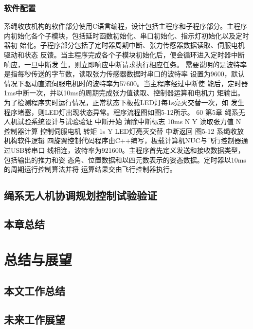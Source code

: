 \documentclass[lang=chs, degree=master, blindreview=false, winfonts=true]{yanputhesis}
\begin{document}
\subsection{软件配置}
系绳收放机构的软件部分使用C语言编程，设计包括主程序和子程序部分。主程序
内初始化各个子模块，包括延时函数初始化、串口初始化、指示灯初始化以及定时器初
始化。子程序部分包括了定时器周期中断、张力传感器数据读取、伺服电机驱动和状态
反馈。当主程序完成各个子模块初始化后，便会循环进入定时器中断响应，一旦中断发
生，则立即响应中断请求执行相应任务。 
需要说明的是波特率是指每秒传送的字节数，读取张力传感器数据时串口的波特率
设置为9600，默认情况下驱动直流伺服电机时的波特率为57600。当主程序经过中断使
能后，定时器1ms中断一次，并以10ms的周期完成张力值读取、控制器运算和电机力
矩输出。为了检测程序实时运行情况，正常状态下板载LED灯每1s亮灭交替一次，如
发生程序堵塞，则LED灯出现状态异常。程序流程图如图5-12所示。 
60 
第5章  绳系无人机试验系统设计与试验验证 
中断开始
清除中断标志
10ms
N
Y
读取张力值
N
控制器计算
控制伺服电机
转矩
1s
Y
LED灯亮灭交替
中断返回
图5-12 系绳收放机构软件逻辑 
四旋翼控制代码程序由C++编写，板载计算机NUC与飞行控制器通过USB转串口
线相连，波特率为921600。主程序首先定义发送和接收数据类型，包括输出的推力和姿
态角、位置数据和以四元数表示的姿态数据。定时器以10ms的周期运行控制算法并将
运算结果交由飞行控制器执行。 



\section{绳系无人机协调规划控制试验验证}
\section{本章总结}


\cleardoublepage

\chapter{总结与展望}


\section{本文工作总结}


\section{未来工作展望}
\end{document}
